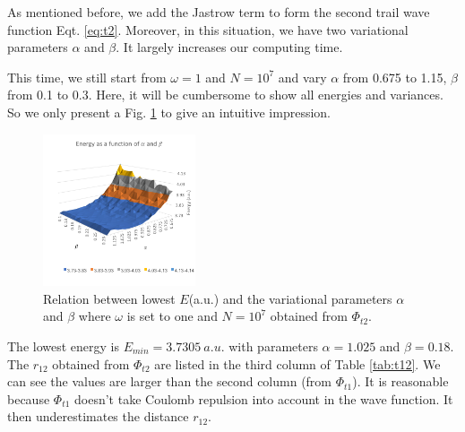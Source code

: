 As mentioned before, we add the Jastrow term to form the second trail wave function Eqt. \ref{eq:t2}.
Moreover, in this situation, we have two variational parameters $\alpha$ and $\beta$.
It largely increases our computing time.

This time, we still start from $\omega=1$ and $N=10^7$ and vary $\alpha$ from 0.675 to 1.15, $\beta$ from 0.1 to 0.3.
Here, it will be cumbersome to show all energies and variances.
So we only present a Fig. \ref{fig:t2} to give an intuitive impression.
\begin{figure}[tb]
\label{fig:t2}
\centering
\includegraphics[width=0.4\textwidth]{t2.png}
\caption{Relation between lowest $E$(a.u.) and the variational parameters $\alpha$ and $\beta$ where $\omega$ is set to one and $N=10^7$ obtained from $\Phi_{t2}$.}
\end{figure}
The lowest energy is $E_{min}=3.7305\ a.u.$ with parameters $\alpha=1.025$ and $\beta=0.18$.
The $r_{12}$ obtained from $\Phi_{t2}$ are listed in the third column of Table \ref{tab:t12}.
We can see the values are larger than the second column (from $\Phi_{t1}$).
It is reasonable because $\Phi_{t1}$ doesn't take Coulomb repulsion into account in the wave function.
It then underestimates the distance $r_{12}$.

